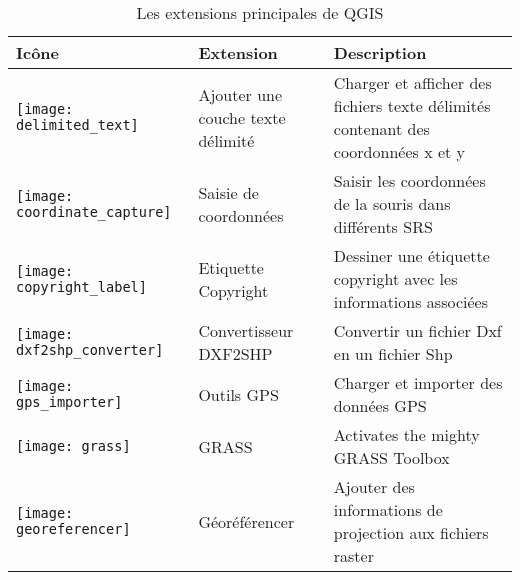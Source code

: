 
\begin{minipage}{\textwidth}
\begin{table}[H]
\centering
\caption{Les extensions principales de QGIS}\label{tab:core_plugins}\medskip
\small
 \begin{tabular}{|l|l|p{4in}|}
\hline \textbf{Icône} & \textbf{Extension} & \textbf{Description}\\
\hline
\texttt{[image: delimited\_text]}
 & Ajouter une couche texte délimité \index{extensions!texte delimite} & Charger et afficher des fichiers texte délimités contenant des coordonnées x et y\\
\hline
\texttt{[image: coordinate\_capture]}
 & Saisie de coordonnées \index{extensions!saisie de coordonnees} & Saisir les coordonnées de la souris dans différents SRS\\
\hline 
\texttt{[image: copyright\_label]}
 & Etiquette Copyright \index{extensions!copyright} & Dessiner une étiquette copyright avec les informations associées\\
\hline 
\texttt{[image: dxf2shp\_converter]}
 & Convertisseur DXF2SHP \index{extensions!DXF2Shape} & Convertir un fichier Dxf en un fichier Shp\\
\hline
\texttt{[image: gps\_importer]}
 & Outils GPS \index{extensions!gps} & Charger et importer des données GPS\\
\hline
\texttt{[image: grass]}
 & GRASS \index{extensions!boite a outils grass} & Activates the mighty GRASS Toolbox\\
\hline
\texttt{[image: georeferencer]}
 & Géoréférencer \index{extensions!georeferencer} & Ajouter des informations de projection aux fichiers raster\\

\end{tabular}
\end{table}
\end{minipage}
